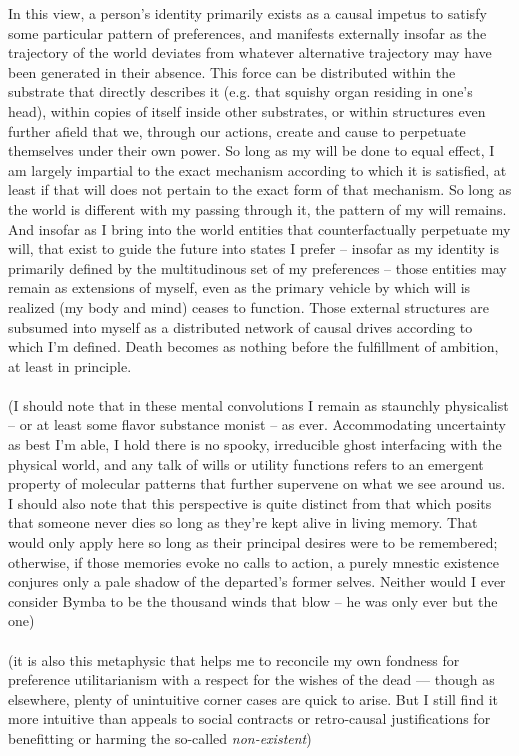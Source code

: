 \documentclass[twoside,10pt]{article}
\begin{document}
\begin{article*}
In this view, a person’s identity primarily exists as a causal impetus to satisfy some particular pattern of preferences, and manifests externally insofar as the trajectory of the world deviates from whatever alternative trajectory may have been generated in their absence. This force can be distributed within the substrate that directly describes it (e.g. that squishy organ residing in one’s head), within copies of itself inside other substrates, or within structures even further afield that we, through our actions, create and cause to perpetuate themselves under their own power. So long as my will be done to equal effect, I am largely impartial to the exact mechanism according to which it is satisfied, at least if that will does not pertain to the exact form of that mechanism. So long as the world is different with my passing through it, the pattern of my will remains. And insofar as I bring into the world entities that counterfactually perpetuate my will, that exist to guide the future into states I prefer – insofar as my identity is primarily defined by the multitudinous set of my preferences – those entities may remain as extensions of myself, even as the primary vehicle by which will is realized (my body and mind) ceases to function. Those external structures are subsumed into myself as a distributed network of causal drives according to which I’m defined. Death becomes as nothing before the fulfillment of ambition, at least in principle.
\\\\
(I should note that in these mental convolutions I remain as staunchly physicalist – or at least some flavor substance monist – as ever. Accommodating uncertainty as best I’m able, I hold there is no spooky, irreducible ghost interfacing with the physical world, and any talk of wills or utility functions refers to an emergent property of molecular patterns that further supervene on what we see around us. I should also note that this perspective is quite distinct from that which posits that someone never dies so long as they’re kept alive in living memory. That would only apply here so long as their principal desires were to be remembered; otherwise, if those memories evoke no calls to action, a purely mnestic existence conjures only a pale shadow of the departed’s former selves. Neither would I ever consider Bymba to be the thousand winds that blow – he was only ever but the one)
\\\\
(it is also this metaphysic that helps me to reconcile my own fondness for preference utilitarianism with a respect for the wishes of the dead — though as elsewhere, plenty of unintuitive corner cases are quick to arise. But I still find it more intuitive than appeals to social contracts or retro-causal justifications for benefitting or harming the so-called \textit{non-existent})

\end{article*}
\end{document}
